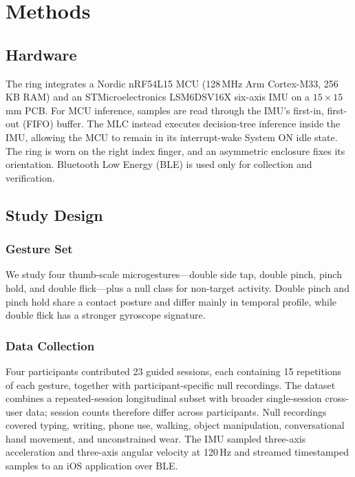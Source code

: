 \section{Methods}

\subsection{Hardware}

The ring integrates a Nordic nRF54L15 MCU (128\,MHz Arm Cortex-M33,
256\,KB RAM) and an STMicroelectronics LSM6DSV16X six-axis IMU on a
$15\times15$\,mm PCB. For MCU inference, samples are read through the IMU's
first-in, first-out (FIFO) buffer. The MLC instead executes decision-tree
inference inside the IMU, allowing the MCU to remain in its interrupt-wake
System ON idle state. The ring is worn on the right index finger, and an
asymmetric enclosure fixes its orientation. Bluetooth Low Energy (BLE) is used
only for collection and verification.

\subsection{Study Design}

\subsubsection{Gesture Set}

We study four thumb-scale microgestures---double side tap, double pinch, pinch
hold, and double flick---plus a null class for non-target activity. Double
pinch and pinch hold share a contact posture and differ mainly in temporal
profile, while double flick has a stronger gyroscope signature.

\subsubsection{Data Collection}

Four participants contributed 23 guided sessions, each containing 15
repetitions of each gesture, together with participant-specific null
recordings. The dataset combines a repeated-session longitudinal subset with
broader single-session cross-user data; session counts therefore differ across
participants. Null recordings covered typing, writing, phone use, walking,
object manipulation, conversational hand movement, and unconstrained wear.
The IMU sampled three-axis acceleration and three-axis angular velocity at
120\,Hz and streamed timestamped samples to an iOS application over BLE.

